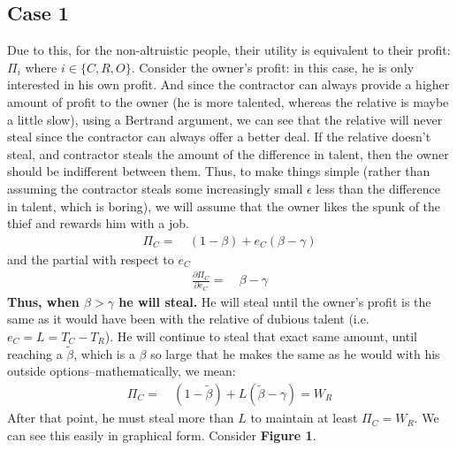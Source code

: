 \documentclass[12pt]{paper}
\begin{document}
\subsection{Case 1}
Due to this, for the non-altruistic people, their utility is
equivalent to their profit: $\Pi_i$ where $i\in \{C,R,O\}$. Consider the
owner's profit: in this case, he is only interested in his own
profit. And since the contractor can always provide a higher amount of
profit to the owner (he is more talented, whereas the relative is
maybe a little slow), using a Bertrand argument, we can see that the
relative will never steal since the contractor can always offer a
better deal. If the relative doesn't steal, and contractor steals the
amount of the difference in talent, then the owner should be
indifferent between them. Thus, to make things simple (rather than
assuming the contractor steals some increasingly small $\epsilon$ less than
the difference in talent, which is boring), we will assume that the
owner likes the spunk of the thief and rewards him with a job.
\begin{align*}
\Pi_C=&~(1-\beta)+e_C(\beta-\gamma)
\end{align*}
and the partial with respect to $e_C$
\begin{align*}
\frac{\partial \Pi_C}{\partial e_C}=&~\beta-\gamma
\end{align*}
\textbf{Thus, when $\beta>\gamma$ he will steal.} He will steal until the
owner's profit is the same as it would have been with the relative of
dubious talent (i.e. $e_C=L=T_C-T_R$). He will continue to steal that
exact same amount, until reaching a $\tilde{\beta}$, which is a
$\beta$ so large that he makes the same as he would with his outside
options--mathematically, we mean:
\begin{align*}
\Pi_C=&~(1-\tilde{\beta})+L(\tilde{\beta}-\gamma)=W_R
\end{align*}
After that point, he must steal more than $L$ to maintain at least
$\Pi_C=W_R$. We can see this easily in graphical form. Consider
\textbf{Figure 1}.

\begin{figure}[h!]
  \centering
{}
\end{figure}
\end{document}
